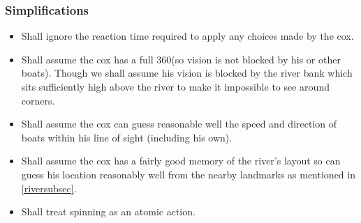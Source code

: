 \subsubsection{Simplifications}
\begin{itemize}
  \item Shall ignore the reaction time required to apply any choices
    made by the cox.
  \item Shall assume the cox has a full 360\textdegree (so vision is
    not blocked by his or other boats). Though we shall assume his
    vision is blocked by the river bank which sits sufficiently high
    above the river to make it impossible to see around corners.
  \item Shall assume the cox can guess reasonable well the speed and
    direction of boats within his line of sight (including his own).
  \item Shall assume the cox has a fairly good memory of the river's
    layout so can guess his location reasonably well from the nearby
    landmarks as mentioned in \ref{riversubsec}.
  \item Shall treat spinning as an atomic action.
\end{itemize}
